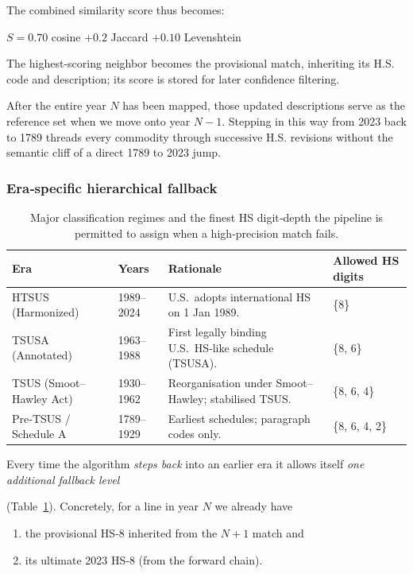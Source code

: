 \documentclass[12pt]{article}
\begin{document}
The combined similarity score thus becomes:
\begin{center}
    $S = 0.70$ cosine $+ 0.2$ Jaccard $+ 0.10$ Levenshtein
\end{center}
The highest-scoring neighbor becomes the provisional match, inheriting its H.S. code and description; its score is stored for later confidence filtering. 

After the entire year $N$ has been mapped, those updated descriptions serve as the reference set when we move onto year $N-1$. Stepping in this way from 2023 back to 1789 threads every commodity through successive H.S. revisions without the semantic cliff of a direct 1789 to 2023 jump. 

\subsubsection*{Era‑specific hierarchical fallback}

\begin{table}[H]
\centering
\caption{Major classification regimes and the finest HS digit‐depth the pipeline is permitted to assign when a high‑precision
match fails.\label{tab:regimes}}

\begin{tabular}{llll}
\toprule
\textbf{Era} & \textbf{Years} & \textbf{Rationale} & \textbf{Allowed HS digits}\\
\midrule
HTSUS (Harmonized)      & 1989–2024 & U.S.\ adopts international HS on 1 Jan 1989.           & \{8\}\\
TSUSA (Annotated)       & 1963–1988 & First legally binding U.S.\ HS‑like schedule (TSUSA).  & \{8, 6\}\\
TSUS (Smoot–Hawley Act) & 1930–1962 & Reorganisation under Smoot–Hawley; stabilised TSUS.    & \{8, 6, 4\}\\
Pre‑TSUS / Schedule A   & 1789–1929 & Earliest schedules; paragraph codes only.             & \{8, 6, 4, 2\}\\
\bottomrule
\end{tabular}
\end{table}

Every time the algorithm \emph{steps back} into an earlier era it allows itself \emph{one additional fallback level}

(Table~\ref{tab:regimes}).  Concretely, for a line in year $N$ we already have
\begin{enumerate}[label=(\alph*)]

    \item the provisional HS‑8 inherited from the $N{+}1$ match and
    \item its ultimate 2023 HS‑8 (from the forward chain).
    
\end{enumerate}
\end{document}
